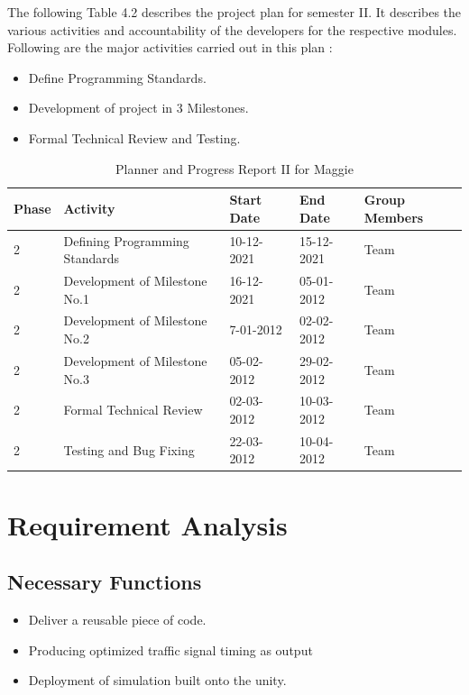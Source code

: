 \documentclass[openany,12pt]{report}
\begin{document}
		\hspace*{0.5 in}The following Table 4.2 describes the project plan for semester II. It describes the various activities and accountability of the developers for the respective modules. Following are the major activities carried out in this plan :
		\begin{itemize}
			\item{Define Programming Standards.}
			\item{Development of project in 3 Milestones.}
			\item{Formal Technical Review and Testing.}
		\end{itemize}
		\newpage
		\begin{table} [htb]
			\begin{tabular}{| p{1.2 cm}| p{5 cm}| p{2.5 cm}| p{2.5 cm}| p{3 cm}| }\hline
				\textbf{Phase}	&\textbf{Activity}	&\textbf{Start Date}	&\textbf{End Date} &\textbf{Group Members}\\\hline\hline
				2 &Defining Programming Standards	&10-12-2021 	&15-12-2021 &Team \\\hline
				2 &Development of Milestone No.1 &16-12-2021 &05-01-2012 &Team\\\hline
				2 &Development of Milestone No.2 &7-01-2012 &02-02-2012 &Team\\\hline
				2 &Development of Milestone No.3 &05-02-2012 &29-02-2012 & Team \\\hline
				2 &Formal Technical Review &02-03-2012 &10-03-2012 &Team \\\hline
				2 &Testing and Bug Fixing  &22-03-2012 &10-04-2012 &Team\\\hline
				
			\end{tabular}
			\caption{Planner and Progress Report II for Maggie}
			\label{tab:nnwork}
		\end{table}
	
	
	
	\section{Requirement Analysis}
	
	\subsection{Necessary Functions}
	\begin{itemize}
		\item{Deliver a reusable piece of code.}
		\item{Producing optimized traffic signal timing as output}
		\item{Deployment of simulation built onto the unity.}
	\end{itemize}
	
\end{document}
